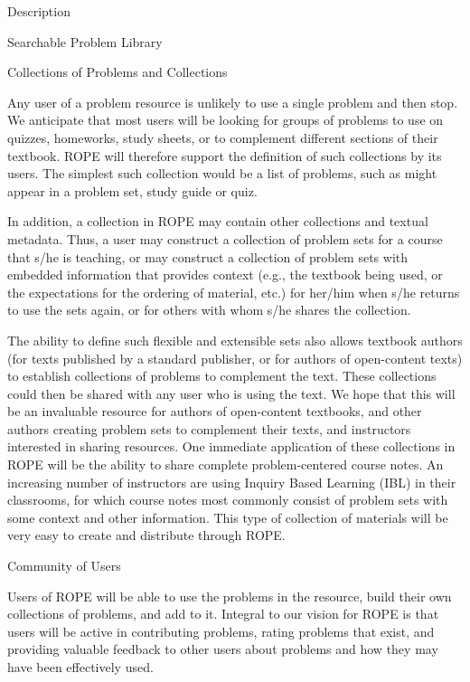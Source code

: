 \documentclass[11pt]{article}
\begin{document}
\begin{section}{Description}
\begin{subsection}{Searchable Problem Library}
\end{subsection}

\begin{subsection}{Collections of Problems and Collections}

Any user of a problem resource is unlikely to use a single problem and
then stop.  We anticipate that most users will be looking for groups of
problems to use on quizzes, homeworks, study sheets, or to complement
different sections of their textbook.  ROPE will therefore support the
definition of such collections by its users.  The simplest such collection
would be a list of problems, such as might appear in a problem set, study
guide or quiz.

In addition, a collection in ROPE may contain other collections and
textual metadata.  Thus, a user may construct a collection of problem sets
for a course that s/he is teaching, or may construct a collection of
problem sets with embedded information that provides context (e.g., the
textbook being used, or the expectations for the ordering of material,
etc.) for her/him when s/he returns to use the sets again, or for others
with whom s/he shares the collection.

The ability to define such flexible and extensible sets also allows 
textbook authors (for texts published by a standard publisher, or for
authors of open-content texts) to establish collections of problems to
complement the text.  These collections could then be shared with any user 
who is using the text.  We hope that this will be an invaluable resource
for authors of open-content textbooks, and other authors creating problem
sets to complement their texts, and instructors interested in sharing
resources.  One immediate application of these collections in ROPE will be the
ability to share complete problem-centered course notes.  An increasing
number of instructors are using Inquiry Based Learning (IBL) in their
classrooms, for which course notes most commonly consist of problem sets
with some context and other information.  This type of collection of
materials will be very easy to create and distribute through ROPE.

\end{subsection}

\begin{subsection}{Community of Users}

Users of ROPE will be able to use the problems in the resource, build
their own collections of problems, and add to it.  Integral to our vision
for ROPE is that users will be active in contributing problems, rating
problems that exist, and providing valuable feedback to other users about
problems and how they may have been effectively used.


\end{subsection}
\end{section}
\end{document}
